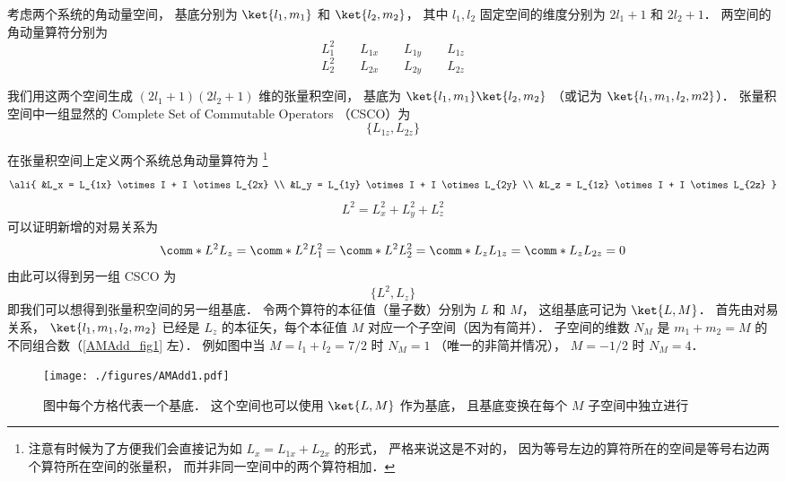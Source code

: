 

考虑两个系统的角动量空间， 基底分别为 $\ket{l_1, m_1}$ 和 $\ket{l_2, m_2}$， 其中 $l_1, l_2$ 固定空间的维度分别为 $2l_1+1$ 和 $2l_2+1$． 两空间的角动量算符分别为
\begin{equation}\label{AMAdd_eq2}\label{AMAdd_eq1}
L_1^2 \qquad L_{1x} \qquad L_{1y} \qquad L_{1z}
\end{equation}
\begin{equation}
L_2^2 \qquad L_{2x} \qquad L_{2y} \qquad L_{2z}
\end{equation}

我们用这两个空间生成 $(2l_1+1)(2l_2+1)$ 维的张量积空间， 基底为 $\ket{l_1, m_1} \ket{l_2, m_2}$ （或记为 $\ket{l_1, m_1, l_2, m2}$）． 张量积空间中一组显然的 Complete Set of Commutable Operators （CSCO）为
\begin{equation}
\{L_{1z}, L_{2z}\}
\end{equation}

在张量积空间上定义两个系统总角动量算符为%
\footnote{注意有时候为了方便我们会直接记为如 $L_x = L_{1x} + L_{2x}$ 的形式， 严格来说这是不对的， 因为等号左边的算符所在的空间是等号右边两个算符所在空间的张量积， 而并非同一空间中的两个算符相加．}
\begin{equation}\ali{
&L_x = L_{1x} \otimes I +  I \otimes L_{2x} \\
&L_y = L_{1y} \otimes I +  I \otimes L_{2y} \\
&L_z = L_{1z} \otimes I +  I \otimes L_{2z}
}\end{equation}
\begin{equation}
L^2 = L_x^2 + L_y^2 + L_z^2
\end{equation}
可以证明新增的对易关系为
\begin{equation}
\comm*{L^2}{L_z} = \comm*{L^2}{L_1^2} = \comm*{L^2}{L_2^2} = 
\comm*{L_z}{L_{1z}} = \comm*{L_z}{L_{2z}} = 0
\end{equation}
由此可以得到另一组 CSCO 为 %
\begin{equation}
\{L^2, L_z\}
\end{equation}
即我们可以想得到张量积空间的另一组基底． 令两个算符的本征值（量子数）分别为 $L$  和 $M$， 这组基底可记为 $\ket{L, M}$．  首先由对易关系， $\ket{l_1, m_1, l_2, m_2}$ 已经是 $L_z$ 的本征矢，每个本征值 $M$ 对应一个子空间（因为有简并）． 子空间的维数 $N_M$ 是 $m_1 + m_2 = M$ 的不同组合数（\autoref{AMAdd_fig1} 左）． 例如图中当 $M = l_1 + l_2 = 7/2$ 时 $N_M = 1$ （唯一的非简并情况）， $M = -1/2$ 时 $N_M = 4$．
\begin{figure}[ht]
\centering
\texttt{[image: ./figures/AMAdd1.pdf]}
\caption{图中每个方格代表一个基底． 这个空间也可以使用 $\ket{L, M}$ 作为基底， 且基底变换在每个 $M$ 子空间中独立进行} \label{AMAdd_fig1}
\end{figure}

